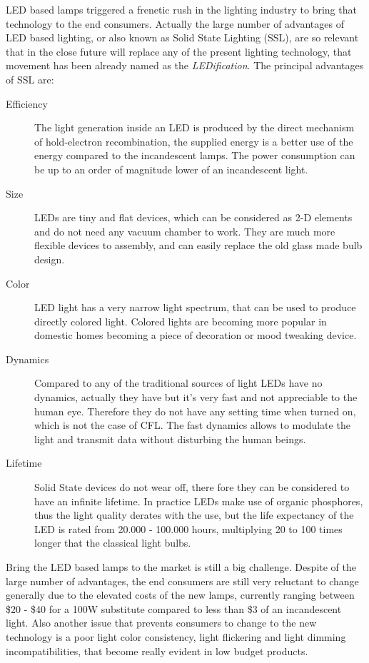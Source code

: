 LED based lamps triggered  a frenetic rush in the lighting industry to bring that technology to the end consumers. Actually the large number of advantages of LED based lighting, or also known as Solid State Lighting (SSL), are so relevant that in the close future will replace any of the present lighting technology, that movement has been already named as the \emph{LEDification}. The principal advantages of SSL are:
\begin{description}
  \item [Efficiency] The light generation inside an LED is produced by the direct mechanism of hold-electron recombination, the supplied energy is a better use of the energy compared to the incandescent lamps. The power consumption can be up to an order of magnitude lower of an incandescent light.

  \item [Size] LEDs are tiny and flat devices, which can be considered as 2-D elements and do not need any vacuum chamber to work. They are much more flexible devices to assembly, and can easily replace the old glass made bulb design.

  \item [Color] LED light has a very narrow light spectrum, that can be used to produce directly colored light. Colored lights are becoming more popular in domestic homes becoming a piece of decoration or mood tweaking device.

  \item [Dynamics] Compared to any of the traditional sources of light LEDs have no dynamics, actually they have but it's very fast and not appreciable to the human eye. Therefore they do not have any setting time when turned on, which is not the case of CFL. The fast dynamics allows to modulate the light and transmit data without disturbing the human beings.

  \item [Lifetime] Solid State devices do not wear off, there fore they can be considered to have an infinite lifetime. In practice LEDs make use of organic phosphores, thus the light quality derates with the use, but the life expectancy of the LED is rated from 20.000 - 100.000 hours, multiplying 20 to 100 times longer that the classical light bulbs.
\end{description}

\vspace{5mm} %

Bring the LED based lamps to the market is still a big challenge. Despite of the large number of advantages, the end consumers are still very reluctant to change generally due to the elevated costs of the new lamps, currently ranging between \$20 - \$40 for a 100W substitute compared to less than \$3 of an incandescent light. Also another issue that prevents consumers to change to the new technology is a poor light color consistency, light flickering and light dimming incompatibilities, that become really evident in low budget products.

